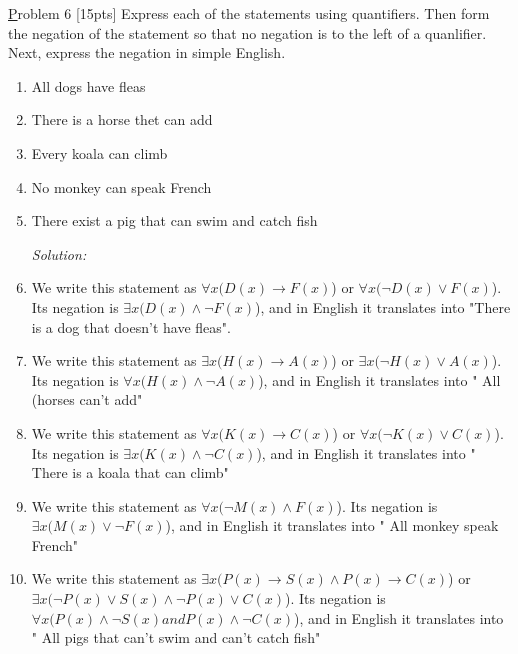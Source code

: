 \documentclass[10pt]{article}
\renewcommand{\implies}{\rightarrow}
\renewcommand{\lor}{\vee}
\renewcommand{\land}{\wedge}
\begin{document}
\clearpage
\underline Problem 6 [15pts] Express each of the statements using quantifiers. Then form the negation of the statement so that no negation is to the left of a quanlifier. Next, express the negation in simple English.
\begin{enumerate}
\item All dogs have fleas 
\item There is a horse thet can add
\item Every koala can climb
\item No monkey can speak French
\item There exist a pig that can swim and catch fish

\textit{Solution:}

\item We write this statement as $\forall x (D(x) \implies F(x)$) or $\forall x (\neg D(x) \lor F(x)$). Its negation is $\exists x (D(x) \land \neg F(x)$), and in English it translates into "There is a dog that doesn't have fleas".
\item We write this statement as $\exists x (H(x) \implies A(x)$) or $\exists x (\neg H(x) \lor A(x)$). Its negation is $\forall x (H(x) \land \neg A(x)$), and in English it translates into " All (horses can't add"
\item We write this statement as $\forall x (K(x) \implies C(x)$) or $\forall x (\neg K(x) \lor C(x)$). Its negation is $\exists x (K(x) \land \neg C(x)$), and in English it translates into " There is a koala that can climb"
\item We write this statement as $\forall x (\neg M(x) \land F(x)$). Its negation is $\exists x (M(x) \lor \neg F(x)$), and in English it translates into " All monkey speak French"
\item We write this statement as $\exists x ( P(x) \implies S(x) \land P(x) \implies C(x)$) or $\exists x (\neg P(x) \lor S(x) \land \neg P(x) \lor C(x)$). Its negation is $\forall x (P(x) \land \neg S(x) and P(x) \land \neg C(x)$), and in English it translates into " All pigs that can't swim and can't catch fish"
\end{enumerate}     
\end{document}
